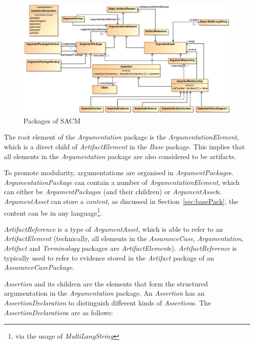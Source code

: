 \begin{figure}
	\centering
	\includegraphics[width=1\linewidth]{fig/Argumentation.eps}
	\caption{Packages of SACM}
	\label{fig:arg}
\end{figure}
The root element of the \textit{Argumentation} package is the \textit{ArgumentationElement}, which is a direct child of \textit{ArtifactElement} in the \textit{Base} package. This implies that all elements in the \textit{Argumentation} package are also considered to be artifacts. 

To promote modularity, argumentations are organised in \textit{ArgumentPackage}s. \textit{ArgumentationPackage} can contain a number of \textit{ArgumentationElement}, which can either be \textit{ArgumentPackage}s (and their children) or \textit{ArgumentAsset}s. \textit{ArgumentAsset} can store a \textit{content}, as discussed in Section~\ref{sec:basePack}, the content can be in any language\footnote{via the usage of \textit{MultiLangString}}.

\textit{ArtifactReference} is a type of \textit{ArgumentAsset}, which is able to refer to an \textit{ArtifactElement} (technically, all elements in the \textit{AssuranceCase}, \textit{Argumentation}, \textit{Artifact} and \textit{Terminology} packages are \textit{ArtifactElement}s). \textit{ArtifactReference} is typically used to refer to evidence stored in the \textit{Artifact} package of an \textit{AssuranceCasePackage}.

\textit{Assertion} and its children are the elements that form the structured argumentation in the \textit{Argumentation} package. An \textit{Assertion} has an \textit{AssertionDeclaration} to distinguish different kinds of \textit{Assertion}s. The \textit{AssertionDeclaration}s are as follows: 

